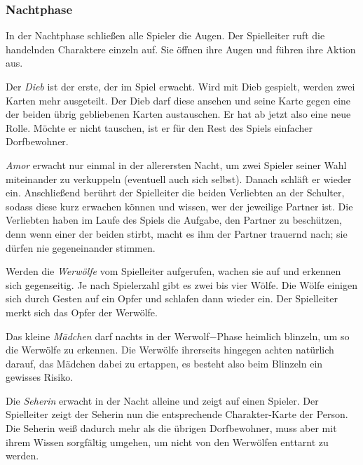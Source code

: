 \documentclass[12pt, a4paper]{article}
\begin{document}
		\subsubsection{Nachtphase}
In der Nachtphase schließen alle Spieler die Augen. Der Spielleiter ruft die handelnden Charaktere einzeln auf. Sie öffnen ihre Augen und führen ihre Aktion aus.

\vspace{0,3 cm}

Der \textit{Dieb} ist der erste, der im Spiel erwacht. Wird mit Dieb gespielt, werden zwei Karten mehr ausgeteilt. Der Dieb darf diese ansehen und seine Karte gegen eine der beiden übrig gebliebenen Karten austauschen. Er hat ab jetzt also eine neue Rolle. Möchte er nicht tauschen, ist er für den Rest des Spiels einfacher Dorfbewohner.

\vspace{0,3 cm}

\textit{Amor} erwacht nur einmal in der allerersten Nacht, um zwei Spieler seiner Wahl miteinander zu
verkuppeln (eventuell auch sich selbst). Danach schläft er wieder ein. Anschließend berührt der
Spielleiter die beiden Verliebten an der Schulter, sodass diese kurz erwachen können und wissen,
wer der jeweilige Partner ist. Die Verliebten haben im Laufe des Spiels die Aufgabe, den Partner
zu beschützen, denn wenn einer der beiden stirbt, macht es ihm der Partner trauernd nach; sie
dürfen nie gegeneinander stimmen.

\vspace{0,3 cm}

Werden die \textit{Werwölfe} vom Spielleiter aufgerufen, wachen sie auf und erkennen sich gegenseitig.
Je nach Spielerzahl gibt es zwei bis vier Wölfe. Die Wölfe einigen sich durch Gesten auf ein Opfer und schlafen dann wieder ein.
Der Spielleiter merkt sich das Opfer der Werwölfe.

\vspace{0,3 cm}

Das kleine \textit{Mädchen} darf nachts in der Werwolf$-$Phase heimlich blinzeln, um so die Werwölfe zu
erkennen. Die Werwölfe ihrerseits hingegen achten natürlich darauf, das Mädchen dabei zu ertappen,
es besteht also beim Blinzeln ein gewisses Risiko.

\vspace{0,3 cm}

Die \textit{Seherin} erwacht in der Nacht alleine und zeigt auf einen Spieler.
Der Spielleiter zeigt der Seherin nun die entsprechende Charakter-Karte der Person.
Die Seherin weiß dadurch mehr als die übrigen Dorfbewohner, muss aber mit ihrem Wissen
sorgfältig umgehen, um nicht von den Werwölfen enttarnt zu werden.
\end{document}
